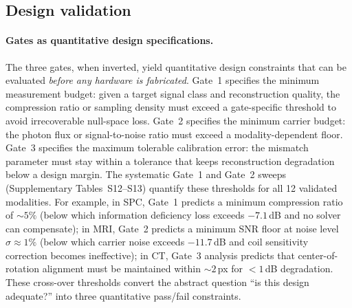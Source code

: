 \documentclass[11pt]{article}
\begin{document}
\FloatBarrier
\subsection*{Design validation}

\paragraph{Gates as quantitative design specifications.}
The three gates, when inverted, yield quantitative design constraints that can be evaluated \emph{before any hardware is fabricated}. Gate~1 specifies the minimum measurement budget: given a target signal class and reconstruction quality, the compression ratio or sampling density must exceed a gate-specific threshold to avoid irrecoverable null-space loss. Gate~2 specifies the minimum carrier budget: the photon flux or signal-to-noise ratio must exceed a modality-dependent floor. Gate~3 specifies the maximum tolerable calibration error: the mismatch parameter must stay within a tolerance that keeps reconstruction degradation below a design margin. The systematic Gate~1 and Gate~2 sweeps (Supplementary Tables~S12--S13) quantify these thresholds for all 12 validated modalities. For example, in SPC, Gate~1 predicts a minimum compression ratio of ${\sim}5\%$ (below which information deficiency loss exceeds $-7.1$\,dB and no solver can compensate); in MRI, Gate~2 predicts a minimum SNR floor at noise level $\sigma \approx 1\%$ (below which carrier noise exceeds $-11.7$\,dB and coil sensitivity correction becomes ineffective); in CT, Gate~3 analysis predicts that center-of-rotation alignment must be maintained within ${\sim}2$\,px for $< 1$\,dB degradation. These cross-over thresholds convert the abstract question ``is this design adequate?'' into three quantitative pass/fail constraints.
\end{document}
